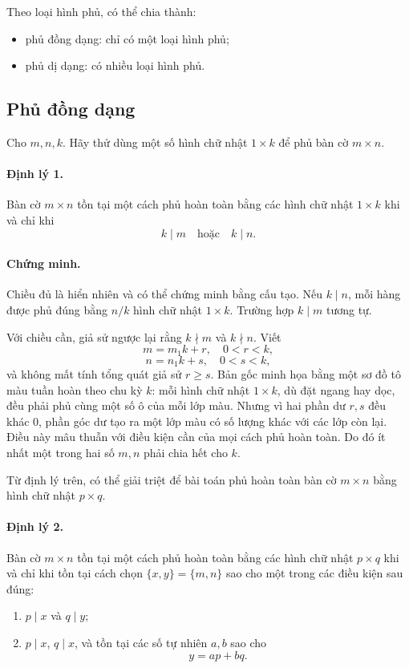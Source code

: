 \documentclass[11pt]{article}
\begin{document}
Theo loại hình phủ, có thể chia thành:
\begin{itemize}
  \item phủ đồng dạng: chỉ có một loại hình phủ;
  \item phủ dị dạng: có nhiều loại hình phủ.
\end{itemize}

\subsection{Phủ đồng dạng}

Cho \(m,n,k\). Hãy thử dùng một số hình chữ nhật \(1\times k\) để phủ bàn cờ
\(m\times n\).

\paragraph{Định lý 1.}
Bàn cờ \(m\times n\) tồn tại một cách phủ hoàn toàn bằng các hình chữ nhật
\(1\times k\) khi và chỉ khi
\[
  k\mid m \quad\text{hoặc}\quad k\mid n.
\]

\paragraph{Chứng minh.}
Chiều đủ là hiển nhiên và có thể chứng minh bằng cấu tạo. Nếu \(k\mid n\),
mỗi hàng được phủ đúng bằng \(n/k\) hình chữ nhật \(1\times k\). Trường hợp
\(k\mid m\) tương tự.

Với chiều cần, giả sử ngược lại rằng \(k\nmid m\) và \(k\nmid n\). Viết
\[
  m=m_1k+r,\quad 0<r<k,
\]
\[
  n=n_1k+s,\quad 0<s<k,
\]
và không mất tính tổng quát giả sử \(r\ge s\). Bản gốc minh họa bằng một sơ
đồ tô màu tuần hoàn theo chu kỳ \(k\): mỗi hình chữ nhật \(1\times k\), dù đặt
ngang hay dọc, đều phải phủ cùng một số ô của mỗi lớp màu. Nhưng vì hai phần
dư \(r,s\) đều khác \(0\), phần góc dư tạo ra một lớp màu có số lượng khác
với các lớp còn lại. Điều này mâu thuẫn với điều kiện cần của mọi cách phủ
hoàn toàn. Do đó ít nhất một trong hai số \(m,n\) phải chia hết cho \(k\).

Từ định lý trên, có thể giải triệt để bài toán phủ hoàn toàn bàn cờ
\(m\times n\) bằng hình chữ nhật \(p\times q\).

\paragraph{Định lý 2.}
Bàn cờ \(m\times n\) tồn tại một cách phủ hoàn toàn bằng các hình chữ nhật
\(p\times q\) khi và chỉ khi tồn tại cách chọn \(\{x,y\}=\{m,n\}\) sao cho
một trong các điều kiện sau đúng:
\begin{enumerate}
  \item \(p\mid x\) và \(q\mid y\);
  \item \(p\mid x\), \(q\mid x\), và tồn tại các số tự nhiên \(a,b\) sao cho
        \[
          y=ap+bq.
        \]
\end{enumerate}
\end{document}
